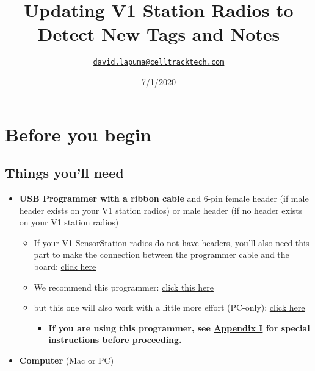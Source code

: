 \documentclass[
]{article}
\title{Updating V1 Station Radios to Detect New Tags and Notes}
\author{\href{mailto:david.lapuma@celltracktech.com}{\nolinkurl{david.lapuma@celltracktech.com}}}
\date{7/1/2020}
\providecommand{\tightlist}{%
  \setlength{\itemsep}{0pt}\setlength{\parskip}{0pt}}
\begin{document}
\maketitle

{
\setcounter{tocdepth}{2}
\tableofcontents
}
\hypertarget{before-you-begin}{%
\section{Before you begin}\label{before-you-begin}}

\hypertarget{things-youll-need}{%
\subsection{Things you'll need}\label{things-youll-need}}

\begin{itemize}
\tightlist
\item
  \textbf{USB Programmer with a ribbon cable} and 6-pin female header
  (if male header exists on your V1 station radios) or male header (if
  no header exists on your V1 station radios)

  \begin{itemize}
  \tightlist
  \item
    If your V1 SensorStation radios do not have headers, you'll also
    need this part to make the connection between the programmer cable
    and the board: \href{https://www.sparkfun.com/products/12807}{click
    here}
  \item
    We recommend this programmer:
    \href{https://www.amazon.com/USBtinyISP-Programmer-Bootloader-Download-Interface/dp/B01FDD4EP0/ref=sr_1_1?crid=3AEXHPTVD9KER\&dchild=1\&keywords=usbtinyisp\&qid=1593638163\&sprefix=usbtiny\%2Caps\%2C149\&sr=8-1}{click
    this here}
  \item
    but this one will also work with a little more effort (PC-only):
    \href{https://www.amazon.com/ARCELI-USBASP-USBasp_H6-Programmer-Support/dp/B0785RQ766/ref=sr_1_12?dchild=1\&keywords=bootloader\&qid=1593638232\&s=electronics\&sr=1-12}{click
    here}

    \begin{itemize}
    \tightlist
    \item
      \textbf{If you are using this programmer, see
      \protect\hyperlink{Appendix_I}{Appendix I} for special
      instructions before proceeding.}
    \end{itemize}
  \end{itemize}
\item
  \textbf{Computer} (Mac or PC)
\end{itemize}
\end{document}
